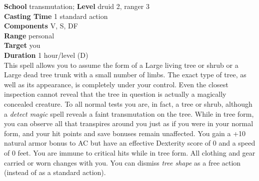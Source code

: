 \textbf{School} transmutation; \textbf{Level} druid 2, ranger 3\\
\textbf{Casting Time} 1 standard action\\
\textbf{Components} V, S, DF\\
\textbf{Range} personal\\
\textbf{Target} you\\
\textbf{Duration} 1 hour/level (D)\\
This spell allows you to assume the form of a Large living tree or shrub or a Large dead tree trunk with a small number of limbs. The exact type of tree, as well as its appearance, is completely under your control. Even the closest inspection cannot reveal that the tree in question is actually a magically concealed creature. To all normal tests you are, in fact, a tree or shrub, although a \textit{detect magic }spell reveals a faint transmutation on the tree. While in tree form, you can observe all that transpires around you just as if you were in your normal form, and your hit points and save bonuses remain unaffected. You gain a +10 natural armor bonus to AC but have an effective Dexterity score of 0 and a speed of 0 feet. You are immune to critical hits while in tree form. All clothing and gear carried or worn changes with you. You can dismiss \textit{tree shape }as a free action (instead of as a standard action).\\
